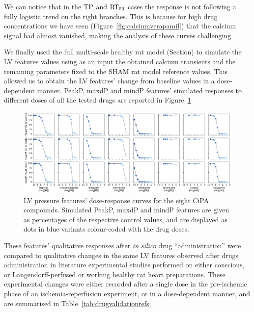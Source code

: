 \noindent
We can notice that in the $\textrm{TP}$ and $\textrm{RT}_{50}$ cases the response is not following a fully logistic trend on the right branches. This is because for high drug concentrations we have seen (Figure~\ref{fig:calciumverapamil}) that the calcium signal had almost vanished, making the analysis of these curves challenging.


\vspace{0.2cm}
We finally used the full multi-scale healthy rat model (Section) to simulate the LV features values using as an input the obtained calcium transients and the remaining parameters fixed to the SHAM rat model reference values. This allowed us to obtain the LV features' change from baseline values in a dose-dependent manner. PeakP, maxdP and mindP features' simulated responses to different doses of all the tested drugs are reported in Figure~\ref{fig:LVfeatsalldrugsrespcurves}

\begin{figure}[!ht]
    \myfloatalign
    \includegraphics[width=1\textwidth]{figures/chapter06/lvp_features_responses_to_all_drugs.pdf}
    \caption{LV pressure features' dose-response curves for the eight CiPA compounds. Simulated PeakP, maxdP and mindP features are given as percentages of the respective control values, and are displayed as dots in blue variants colour-coded with the drug doses. }
    \label{fig:LVfeatsalldrugsrespcurves}
\end{figure}

\noindent
These features' qualitative responses after \textit{in silico} drug ``administration'' were compared to qualitative changes in the same LV features observed after drugs administration in literature experimental studies performed on either conscious, or Langendorff-perfused or working healthy rat heart preparations. These experimental changes were either recorded after a single dose in the pre-ischemic phase of an ischemia-reperfusion experiment, or in a dose-dependent manner, and are summarised in Table~\ref{tab:drugvalidationrefs}.

